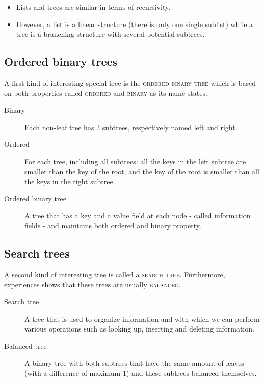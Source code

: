\documentclass[11pt,a4paper,twoside,openright]{report}
\begin{document}
\begin{itemize}
	\item Lists and trees are similar in terms of recursivity.
	\item However, a list is a linear structure (there is only one single 
sublist) while a tree is a branching structure with several potential subtrees.
\end{itemize}

\subsection{Ordered binary trees}

A first kind of interesting special tree is the \textsc{ordered binary tree} 
which is based on both properties called \textsc{ordered} and \textsc{binary} 
as 
its name states.

\begin{description}
	\item[Binary] Each non-leaf tree has 2 subtrees, respectively named 
left and right. 
	\item[Ordered] For each tree, including all subtrees: all the keys in 
the left subtree are smaller than the key of the root, and the key of the root 
is smaller than all the keys in the right subtree.
	\item[Ordered binary tree] A tree that has a key and a value field at 
each node - called information fields - and maintains both ordered and binary 
property.
\end{description}

\subsection{Search trees}

A second kind of interesting tree is called a \textsc{search tree}. 
Furthermore, experiences shows that these trees are usually \textsc{balanced}.

\begin{description}
	\item[Search tree] A tree that is used to organize information and with 
which we can perform various operations such as looking up, inserting and 
deleting information.
	\item[Balanced tree] A binary tree with both subtrees that have the 
same amount of leaves (with a difference of maximum 1) and these subtrees 
balanced themselves.
\end{description}
\end{document}
